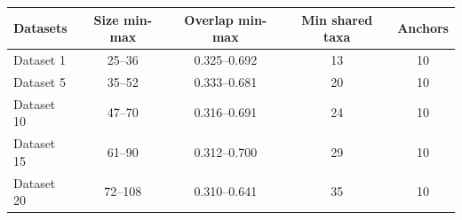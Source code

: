 \begin{tabular}{lcccc}
\hline
Datasets & Size min-max & Overlap min-max & Min shared taxa & Anchors \\
\hline
Dataset 1 & 25--36 & 0.325--0.692 & 13 & 10 \\
Dataset 5 & 35--52 & 0.333--0.681 & 20 & 10 \\
Dataset 10 & 47--70 & 0.316--0.691 & 24 & 10 \\
Dataset 15 & 61--90 & 0.312--0.700 & 29 & 10 \\
Dataset 20 & 72--108 & 0.310--0.641 & 35 & 10 \\
\hline
\end{tabular}
